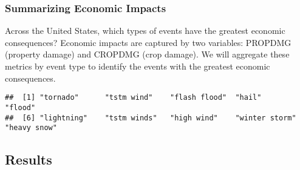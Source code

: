 \documentclass[
]{article}
\newenvironment{Shaded}{\begin{snugshade}}{\end{snugshade}}
\newcommand{\AttributeTok}[1]{\textcolor[rgb]{0.13,0.29,0.53}{#1}}
\newcommand{\CommentTok}[1]{\textcolor[rgb]{0.56,0.35,0.01}{\textit{#1}}}
\newcommand{\ConstantTok}[1]{\textcolor[rgb]{0.56,0.35,0.01}{#1}}
\newcommand{\DecValTok}[1]{\textcolor[rgb]{0.00,0.00,0.81}{#1}}
\newcommand{\FunctionTok}[1]{\textcolor[rgb]{0.13,0.29,0.53}{\textbf{#1}}}
\newcommand{\NormalTok}[1]{#1}
\newcommand{\OtherTok}[1]{\textcolor[rgb]{0.56,0.35,0.01}{#1}}
\newcommand{\SpecialCharTok}[1]{\textcolor[rgb]{0.81,0.36,0.00}{\textbf{#1}}}
\begin{document}
\hypertarget{summarizing-economic-impacts}{%
\subsubsection{Summarizing Economic
Impacts}\label{summarizing-economic-impacts}}

Across the United States, which types of events have the greatest
economic consequences? Economic impacts are captured by two variables:
PROPDMG (property damage) and CROPDMG (crop damage). We will aggregate
these metrics by event type to identify the events with the greatest
economic consequences.

\begin{Shaded}
\end{Shaded}

\begin{verbatim}
##  [1] "tornado"      "tstm wind"    "flash flood"  "hail"         "flood"       
##  [6] "lightning"    "tstm winds"   "high wind"    "winter storm" "heavy snow"
\end{verbatim}

\hypertarget{results}{%
\subsection{Results}\label{results}}
\end{document}
